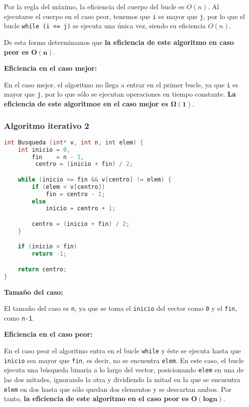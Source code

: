 Por la regla del máximo, la eficiencia del cuerpo del bucle es $O(n)$.
Al ejecutarse el cuerpo en el caso peor, tenemos que \texttt{i} es mayor que \texttt{j}, por lo que el bucle \texttt{while (i <= j)} se ejecuta una única vez, siendo su eficiencia $O(n)$.

De esta forma determinamos que \textbf{la eficiencia de este algoritmo en caso peor es $\boldsymbol{O(n)}$}.

\textbf{Eficiencia en el caso mejor:}

En el caso mejor, el algoritmo no llega a entrar en el primer bucle, ya que \texttt{i} es mayor que \texttt{j}, por lo que sólo se ejecutan operaciones en tiempo constante.
\textbf{La eficiencia de este algoritmoe en el caso mejor es $\boldsymbol{\Omega(1)}$}.

\subsubsection{Algoritmo iterativo 2}

\begin{lstlisting}[language=C]
int Busqueda (int* v, int n, int elem) {
	int inicio = 0,
	    fin    = n - 1,
		 centro = (inicio + fin) / 2;

	while (inicio <= fin && v[centro] != elem) {
		if (elem < v[centro])
			fin = centro - 1;
		else
			inicio = centro + 1;

		centro = (inicio + fin) / 2;
	}

	if (inicio > fin)
		return -1;

	return centro;
}
\end{lstlisting}

\textbf{Tamaño del caso:}

El tamaño del caso es \texttt{n}, ya que se toma el \texttt{inicio} del vector como \texttt{0} y el \texttt{fin}, como \texttt{n-1}.

\textbf{Eficiencia en el caso peor:}

En el caso peor el algoritmo entra en el bucle \texttt{while} y éste se ejecuta hasta que \texttt{inicio} sea mayor que \texttt{fin}, es decir, no se encuentra \texttt{elem}.
En este caso, el bucle ejecuta una búsqueda binaria a lo largo del vector, posicionando \texttt{elem} en una de las dos mitades, ignorando la otra y dividiendo la mitad en la que se encuentra \texttt{elem} en dos hasta que sólo quedan dos elementos y se descartan ambos.
Por tanto, \textbf{la eficiencia de este algoritmo en el caso peor es $\boldsymbol{O(logn)}$}.

